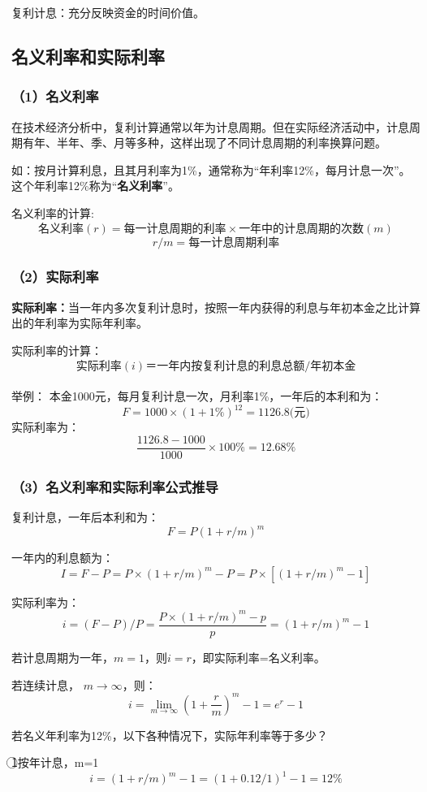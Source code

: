 \documentclass[12pt, a4paper, oneside]{ctexbook}
\begin{document}
复利计息：充分反映资金的时间价值。


\subsection{名义利率和实际利率}
\subsubsection{（1）名义利率}
在技术经济分析中，复利计算通常以年为计息周期。但在实际经济活动中，计息周期有年、半年、季、月等多种，这样出现了不同计息周期的利率换算问题。

如：按月计算利息，且其月利率为1\%，通常称为“年利率12\%，每月计息一次”。这个年利率12\%称为“\textbf{名义利率}”。

名义利率的计算:
$$\mbox{名义利率}(r) = \mbox{每一计息周期的利率} \times \mbox{一年中的计息周期的次数}(m)$$
$$r/m = \mbox{每一计息周期利率}$$

\subsubsection{（2）实际利率}
\textbf{实际利率：}当一年内多次复利计息时，按照一年内获得的利息与年初本金之比计算出的年利率为实际年利率。

实际利率的计算：
$$\mbox{实际利率}(i)＝\mbox{一年内按复利计息的利息总额}/\mbox{年初本金}$$\\
举例：
本金1000元，每月复利计息一次，月利率1\%，一年后的本利和为：
$$F = 1000 \times (1+1\%)^{12}= 1126.8 \mbox{(元)}$$
实际利率为：
$$\frac{1126.8-1000}{1000} \times 100\%=12.68\%$$

\subsubsection{（3）名义利率和实际利率公式推导}
复利计息，一年后本利和为：
$$F=P(1+r/m)^m$$

一年内的利息额为：
$$I=F-P=P \times (1+r/m)^m-P=P \times [(1+r/m)^m-1]$$

实际利率为：
$$i=(F-P)/P=\frac{P \times (1+r/m)^m-p}{p}=(1+r/m)^m-1$$

若计息周期为一年，$m = 1$，则$i = r$，即实际利率=名义利率。

若连续计息， $m \to \infty$，则：
$$i = \lim_{m \to \infty}(1+\frac{r}{m})^m-1=e^r-1$$

若名义年利率为12\%，以下各种情况下，实际年利率等于多少？

\textcircled{1}按年计息，m=1
$$i = (1+ r/m)^m-1=(1+0.12/1)^1-1=12\%$$
\end{document}

